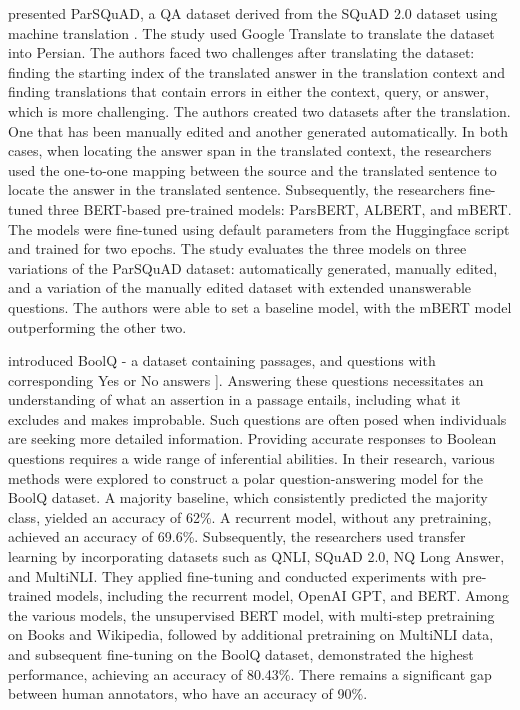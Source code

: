 \cite{abadani2021parsquad} presented ParSQuAD, a QA dataset derived from the SQuAD 2.0 dataset using machine translation \cite{abadani2021parsquad}. The study used Google Translate to translate the dataset into Persian. The authors faced two challenges after translating the dataset: finding the starting index of the translated answer in the translation context and finding translations that contain errors in either the context, query, or answer, which is more challenging. The authors created two datasets after the translation. One that has been manually edited and another generated automatically. In both cases, when locating the answer span in the translated context, the researchers used the one-to-one mapping between the source and the translated sentence to locate the answer in the translated sentence. Subsequently, the researchers fine-tuned three BERT-based pre-trained models: ParsBERT, ALBERT, and mBERT. The models were fine-tuned using default parameters from the Huggingface script and trained for two epochs. The study evaluates the three models on three variations of the ParSQuAD dataset: automatically generated, manually edited, and a variation of the manually edited dataset with extended unanswerable questions. The authors were able to set a baseline model, with the mBERT model outperforming the other two.

\cite{clark2019boolq} introduced BoolQ - a dataset containing passages, and questions with corresponding Yes or No answers \cite{clark2019boolq}]. Answering these questions necessitates an understanding of what an assertion in a passage entails, including what it excludes and makes improbable. Such questions are often posed when individuals are seeking more detailed information. Providing accurate responses to Boolean questions requires a wide range of inferential abilities.  In their research, various methods were explored to construct a polar question-answering model for the BoolQ dataset. A majority baseline, which consistently predicted the majority class, yielded an accuracy of 62\%. A recurrent model, without any pretraining, achieved an accuracy of 69.6\%. Subsequently, the researchers used transfer learning by incorporating datasets such as QNLI, SQuAD 2.0, NQ Long Answer, and MultiNLI. They applied fine-tuning and conducted experiments with pre-trained models, including the recurrent model, OpenAI GPT, and BERT. Among the various models, the unsupervised BERT model, with multi-step pretraining on Books and Wikipedia, followed by additional pretraining on MultiNLI data, and subsequent fine-tuning on the BoolQ dataset, demonstrated the highest performance, achieving an accuracy of 80.43\%. There remains a significant gap between human annotators, who have an accuracy of 90\%. 

